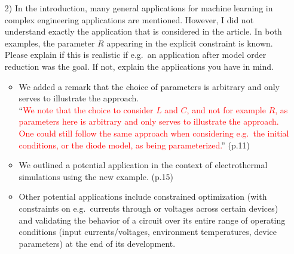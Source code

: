 \documentclass[a4paper, 10pt,
    ]{article}
\begin{document}
\begin{itemize}
        \item[2)] \textcolor{TUDa-0c}{In the introduction, many general applications for machine learning in complex engineering applications are mentioned. However, I did not understand exactly the application that is considered in the article. In both examples, the parameter $R$ appearing in the explicit constraint is known. Please explain if this is realistic if e.g.~an application after model order reduction was the goal. If not, explain the applications you have in mind.}
        \begin{itemize}
        \item We added a remark that the choice of parameters is arbitrary and only serves to illustrate the approach.\\
        ``\textcolor{red}{We note that the choice to consider $L$ and $C$, and not for example $R$, as parameters here is arbitrary and only serves to illustrate the approach. One could still follow the same approach when considering e.g.~the initial conditions, or the diode model, as being parameterized.}'' (p.11)
        \item We outlined a potential application in the context of electrothermal simulations using the new example. (p.15)
        \item Other potential applications include constrained optimization (with constraints on e.g.~currents through or voltages across certain devices) and validating the behavior of a circuit over its entire range of operating conditions (input currents/voltages, environment temperatures, device parameters) at the end of its development.
        \end{itemize}


\end{itemize}
\end{document}
